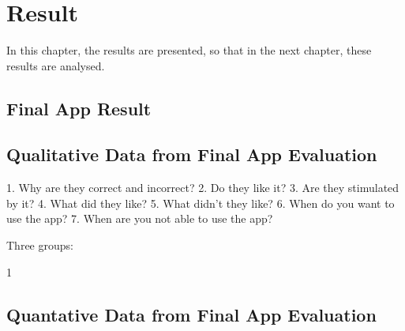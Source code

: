 \chapter{Result}\label{cha:Research}
%


In this chapter, the results are presented, so that in the next chapter, these results are analysed.

%

\section{Final App Result}


\section{Qualitative Data from Final App Evaluation}

1. Why are they correct and incorrect?
2. Do they like it?
3. Are they stimulated by it?
4. What did they like?
5. What didn't they like?
6. When do you want to use the app?
7. When are you not able to use the app?

Three groups:

1

\section{Quantative Data from Final App Evaluation}


%

